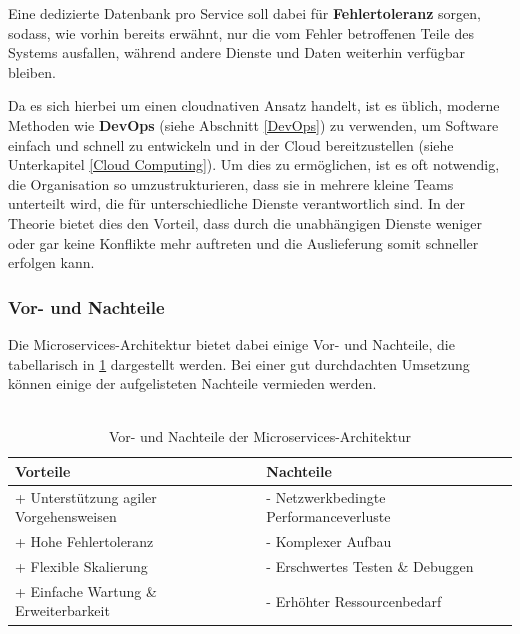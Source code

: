         Eine dedizierte Datenbank pro Service soll dabei für \textbf{Fehlertoleranz} sorgen, sodass, wie vorhin bereits erwähnt, nur die vom Fehler betroffenen Teile des Systems ausfallen, während andere Dienste und Daten weiterhin verfügbar bleiben.
        \cite[S. 268]{EA:Book02}

        Da es sich hierbei um einen cloudnativen Ansatz handelt, ist es üblich, moderne Methoden wie \textbf{DevOps} (siehe Abschnitt \ref{DevOps}) zu verwenden, um Software einfach und schnell zu entwickeln und in der Cloud bereitzustellen (siehe Unterkapitel \ref{Cloud Computing}). 
        Um dies zu ermöglichen, ist es oft notwendig, die Organisation so umzustrukturieren, dass sie in mehrere kleine Teams unterteilt wird, die für unterschiedliche Dienste verantwortlich sind. In der Theorie bietet dies den Vorteil, dass durch die unabhängigen Dienste weniger oder gar keine Konflikte mehr auftreten und die Auslieferung somit schneller erfolgen kann.
        \cite{EA:Web62}


        \subsubsection{Vor- und Nachteile}

        Die Microservices-Architektur bietet dabei einige Vor- und Nachteile, die tabellarisch in \ref{tab:microservices-pros-and-cons} dargestellt werden. Bei einer gut durchdachten Umsetzung können einige der aufgelisteten Nachteile vermieden werden. \\
        \cite[S. 253, 268-269]{EA:Book02} \cite{EA:Web62} \\

        \begin{table}[H]
            \centering
            \begin{tabular}{|p{7.5cm}|p{7.5cm}|}
                \hline
                \cellcolor{green!40} \textbf{Vorteile} & \cellcolor{red!40} \textbf{Nachteile} \\ \hline
                 + Unterstützung agiler Vorgehensweisen & - Netzwerkbedingte Performanceverluste \\
                 + Hohe Fehlertoleranz & - Komplexer Aufbau \\ 
                 + Flexible Skalierung & - Erschwertes Testen \& Debuggen \\
                 + Einfache Wartung \& Erweiterbarkeit & - Erhöhter Ressourcenbedarf \\
                 \hline
            \end{tabular}
            \caption{Vor- und Nachteile der Microservices-Architektur}
            \label{tab:microservices-pros-and-cons}
        \end{table}


